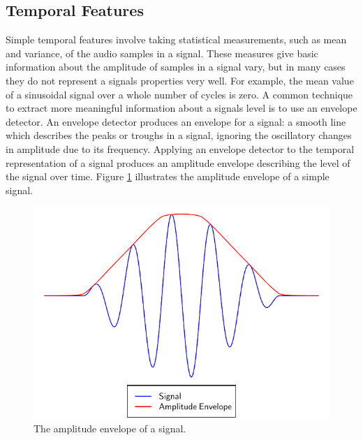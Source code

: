 	\subsection{Temporal Features}
	\label{sec:Timbre-LowLevelFeatures-Temporal}
		Simple temporal features involve taking statistical measurements, such as mean and variance, of the audio
		samples in a signal. These measures give basic information about the amplitude of samples in a signal vary,
		but in many cases they do not represent a signals properties very well. For example, the mean value of a
		sinusoidal signal over a whole number of cycles is zero. A common technique to extract more meaningful
		information about a signals level is to use an envelope detector. An envelope detector produces an envelope
		for a signal: a smooth line which describes the peaks or troughs in a signal, ignoring the oscillatory
		changes in amplitude due to its frequency. Applying an envelope detector to the temporal representation of
		a signal produces an amplitude envelope describing the level of the signal over time. Figure
		\ref{fig:AmplitudeEnvelope} illustrates the amplitude envelope of a simple signal.

		\begin{figure}[h!]
			\centering
			\includegraphics{chapter2/Images/AmplitudeEnvelope.pdf}
			\caption{The amplitude envelope of a signal.}
			\label{fig:AmplitudeEnvelope}
		\end{figure}

